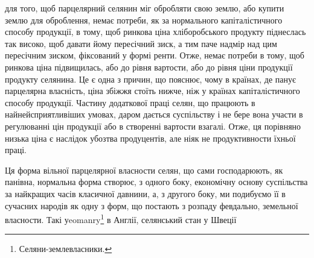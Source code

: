 для того, щоб парцелярний селянин міг обробляти свою землю, або купити
землю для оброблення, немає потреби, як за нормального капіталістичного
способу продукції, в тому, щоб ринкова ціна хліборобського продукту піднеслась
так високо, щоб давати йому пересічний зиск, а тим паче надмір над цим
пересічним зиском, фіксований у формі ренти. Отже, немає потреби в тому,
щоб ринкова ціна підвищилась, або до рівня вартости, або до рівня ціни продукції
продукту селянина. Це є одна з причин, що пояснює, чому в країнах,
де панує парцелярна власність, ціна збіжжя стоїть нижче, ніж у країнах капіталістичного
способу продукції. Частину додаткової праці селян, що працюють
в найнейсприятливіших умовах, даром дається суспільству і не бере вона участи
в регулюванні цін продукції або в створенні вартости взагалі. Отже, ця порівняно
низька ціна є наслідок убозтва продуцентів, але ніяк не продуктивности
їхньої праці.

Ця форма вільної парцелярної власности селян, що сами господарюють, як
панівна, нормальна форма створює, з одного боку, економічну основу суспільства
за найкращих часів класичної давнини, а, з другого боку, ми подибуємо
її в сучасних народів як одну з форм, що постають з розпаду февдально,
земельної власности. Такі уeomanry\footnote*{
Селяни-землевласники. 
} в Англії, селянський стан у Швеції
\parbreak{}  %
